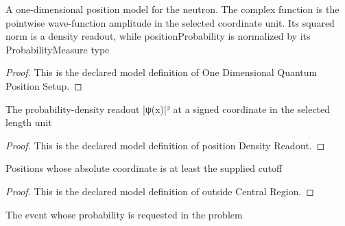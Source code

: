 \begin{definition}
  \label{def:physics:phyx-mini-0503:phyxminiproblems-problemphyxmini0503-onedimensionalquantumpositionsetup}
  A one-dimensional position model for the neutron. The complex function is the pointwise wave-function amplitude in the selected coordinate unit. Its squared norm is a density readout, while positionProbability is normalized by its ProbabilityMeasure type
\end{definition}
\begin{proof}
  This is the declared model definition of One Dimensional Quantum Position Setup.
\end{proof}
\begin{definition}
  \label{def:physics:phyx-mini-0503:phyxminiproblems-problemphyxmini0503-positiondensityreadout}
  The probability-density readout |ψ(x)|² at a signed coordinate in the selected length unit
\end{definition}
\begin{proof}
  This is the declared model definition of position Density Readout.
\end{proof}
\begin{definition}
  \label{def:physics:phyx-mini-0503:phyxminiproblems-problemphyxmini0503-outsidecentralregion}
  Positions whose absolute coordinate is at least the supplied cutoff
\end{definition}
\begin{proof}
  This is the declared model definition of outside Central Region.
\end{proof}
\begin{definition}
  \label{def:physics:phyx-mini-0503:phyxminiproblems-problemphyxmini0503-requestedpositionevent}
  The event whose probability is requested in the problem
\end{definition}
